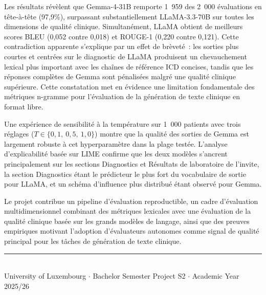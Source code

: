 \documentclass[11pt, a4paper]{article}
\begin{document}
Les r\'{e}sultats r\'{e}v\`{e}lent que Gemma-4-31B remporte 1~959 des 2~000 \'{e}valuations en t\^{e}te-\`{a}-t\^{e}te (97,9\%), surpassant substantiellement LLaMA-3.3-70B sur toutes les dimensions de qualit\'{e} clinique. Simultan\'{e}ment, LLaMA obtient de meilleurs scores BLEU (0,052 contre 0,018) et ROUGE-1 (0,220 contre 0,121). Cette contradiction apparente s'explique par un effet de br\`{e}vet\'{e}~: les sorties plus courtes et centr\'{e}es sur le diagnostic de LLaMA produisent un chevauchement lexical plus important avec les cha\^{i}nes de r\'{e}f\'{e}rence ICD concises, tandis que les r\'{e}ponses compl\`{e}tes de Gemma sont p\'{e}nalis\'{e}es malgr\'{e} une qualit\'{e} clinique sup\'{e}rieure. Cette constatation met en \'{e}vidence une limitation fondamentale des m\'{e}triques n-gramme pour l'\'{e}valuation de la g\'{e}n\'{e}ration de texte clinique en format libre.

Une exp\'{e}rience de sensibilit\'{e} \`{a} la temp\'{e}rature sur 1~000 patients avec trois r\'{e}glages ($T \in \{0{,}1,\ 0{,}5,\ 1{,}0\}$) montre que la qualit\'{e} des sorties de Gemma est largement robuste \`{a} cet hyperparam\`{e}tre dans la plage test\'{e}e. L'analyse d'explicabilit\'{e} bas\'{e}e sur LIME confirme que les deux mod\`{e}les s'ancrent principalement sur les sections Diagnostics et R\'{e}sultats de laboratoire de l'invite, la section Diagnostics \'{e}tant le pr\'{e}dicteur le plus fort du vocabulaire de sortie pour LLaMA, et un sch\'{e}ma d'influence plus distribu\'{e} \'{e}tant observ\'{e} pour Gemma.

Le projet contribue un pipeline d'\'{e}valuation reproductible, un cadre d'\'{e}valuation multidimensionnel combinant des m\'{e}triques lexicales avec une \'{e}valuation de la qualit\'{e} clinique bas\'{e}e sur les grands mod\`{e}les de langage, ainsi que des preuves empiriques motivant l'adoption d'\'{e}valuateurs autonomes comme signal de qualit\'{e} principal pour les t\^{a}ches de g\'{e}n\'{e}ration de texte clinique.

\vfill
\begin{center}
  \rule{\linewidth}{0.4pt}\\[0.2cm]
  \small University of Luxembourg $\cdot$ Bachelor Semester Project S2 $\cdot$ Academic Year 2025/26
\end{center}
\end{document}
